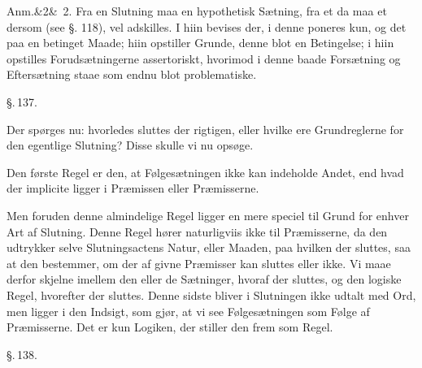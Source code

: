 \documentclass[12pt]{book}
\def\sperr#1{#1}%
\def\textit#1{#1}%
\newcommand{\sperr}[1]{\textls[180]{#1}}
\newcommand{\parag}[1]{%
  \par\vspace{0.9\baselineskip}%
  {\centering\textit{\S.\,#1.}\par}%
  \vspace{0.35\baselineskip}%
  \noindent\hspace{\parindent}\ignorespaces
}
\newcommand{\anm}[1]{%
  \par\vspace{0.5\baselineskip}%
  \noindent\hspace{\parindent}\sperr{Anm.}\ifx&#1&\else~\textit{#1}.\fi
  \enspace\ignorespaces
}
\newcommand{\opage}[1]{\marginnote{\footnotesize\textit{[#1]}}}
\begin{document}
\anm{2} Fra en Slutning maa en hypothetisk Sætning, fra et da maa et dersom (see
§. 118), vel adskilles. I hiin bevises der, i denne poneres kun, og det paa en betinget
Maade; hiin opstiller Grunde, denne blot en Betingelse; i hiin opstilles
Forudsætningerne assertoriskt, hvorimod i denne baade Forsætning og Eftersætning staae
som endnu blot problematiske.

\parag{137}

Der spørges nu: hvorledes sluttes der rigtigen, eller hvilke ere Grundreglerne for den
egentlige Slutning? Disse skulle vi nu opsøge.

Den første Regel er den, at Følgesætningen ikke kan indeholde Andet, end hvad der
\textit{implicite} ligger i Præmissen eller Præmisserne.

Men foruden denne almindelige Regel ligger en mere speciel til Grund for enhver Art af
Slutning. Denne Regel hører naturligviis ikke til Præmisserne, da den udtrykker selve
Slutningsactens Natur, eller Maaden, paa hvilken
\opage{325} der sluttes, saa at den bestemmer, om der af givne Præmisser kan sluttes eller ikke. Vi
maae derfor skjelne imellem den eller de Sætninger, hvoraf der sluttes, og den logiske
Regel, hvorefter der sluttes. Denne sidste bliver i Slutningen ikke udtalt med Ord, men
ligger i den Indsigt, som gjør, at vi see Følgesætningen som Følge af Præmisserne. Det
er kun Logiken, der stiller den frem som Regel.

\parag{138}
\end{document}

